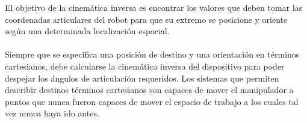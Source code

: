 \documentclass[12pt,a4paper]{article}
\begin{document}
El objetivo de la cinemática inversa es encontrar los valores que deben tomar las coordenadas articulares del robot para que su extremo se posicione y oriente según una determinada localización espacial. \\
\\
Siempre que se especifica una posición de destino y una orientación en términos cartesianos, debe calcularse la cinemática inversa del dispositivo para poder despejar los ángulos de articulación requeridos. Los sistemas que permiten describir destinos términos cartesianos son capaces de mover el manipulador a puntos que nunca fueron capaces de mover el espacio de trabajo a los cuales tal vez nunca haya ido antes.
\end{document}
